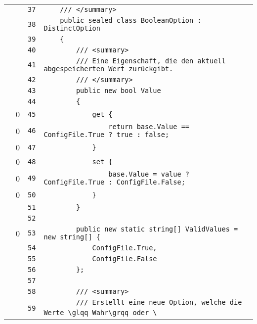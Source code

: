 \documentclass[a4paper,10pt]{article}
\begin{document}
\begin{longtable}[l]{lrrl}
\cellcolor{gray} &  & \verb~37~ & \verb~    /// </summary>~\\
\cellcolor{gray} &  & \verb~38~ & \verb~    public sealed class BooleanOption : DistinctOption~\\
\cellcolor{gray} &  & \verb~39~ & \verb~    {~\\
\cellcolor{gray} &  & \verb~40~ & \verb~        /// <summary>~\\
\cellcolor{gray} &  & \verb~41~ & \verb~        /// Eine Eigenschaft, die den aktuell abgespeicherten Wert zurückgibt.~\\
\cellcolor{gray} &  & \verb~42~ & \verb~        /// </summary>~\\
\cellcolor{gray} &  & \verb~43~ & \verb~        public new bool Value~\\
\cellcolor{gray} &  & \verb~44~ & \verb~        {~\\
\cellcolor{red} & 0 & \verb~45~ & \verb~            get {~\\
\cellcolor{red} & 0 & \verb~46~ & \verb~                return base.Value == ConfigFile.True ? true : false;~\\
\cellcolor{red} & 0 & \verb~47~ & \verb~            }~\\
\cellcolor{red} & 0 & \verb~48~ & \verb~            set {~\\
\cellcolor{red} & 0 & \verb~49~ & \verb~                base.Value = value ? ConfigFile.True : ConfigFile.False;~\\
\cellcolor{red} & 0 & \verb~50~ & \verb~            }~\\
\cellcolor{gray} &  & \verb~51~ & \verb~        }~\\
\cellcolor{gray} &  & \verb~52~ & \verb~~\\
\cellcolor{red} & 0 & \verb~53~ & \verb~        public new static string[] ValidValues = new string[] {~\\
\cellcolor{gray} &  & \verb~54~ & \verb~            ConfigFile.True,~\\
\cellcolor{gray} &  & \verb~55~ & \verb~            ConfigFile.False~\\
\cellcolor{gray} &  & \verb~56~ & \verb~        };~\\
\cellcolor{gray} &  & \verb~57~ & \verb~~\\
\cellcolor{gray} &  & \verb~58~ & \verb~        /// <summary>~\\
\cellcolor{gray} &  & \verb~59~ & \verb~        /// Erstellt eine neue Option, welche die Werte \glqq Wahr\grqq oder \~\\

\end{longtable}
\end{document}
